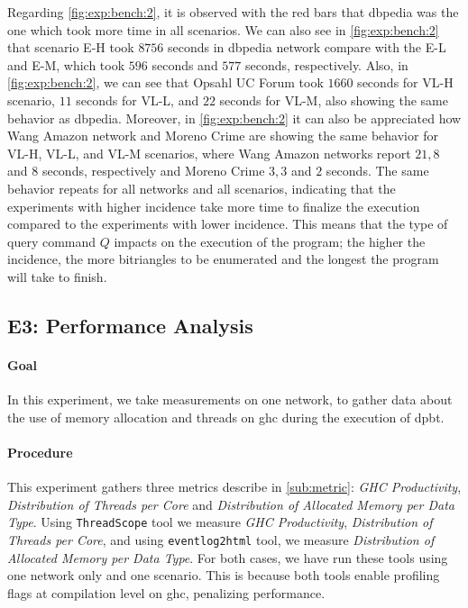 Regarding \autoref{fig:exp:bench:2}, it is observed with the red bars that \acrshort{dbpedia} was the one which took more time in all scenarios.
We can also see in \autoref{fig:exp:bench:2} that scenario E-H took $8756$ seconds in \acrshort{dbpedia} network compare with the E-L and E-M, which took $596$ seconds and $577$ seconds, respectively. 
Also, in \autoref{fig:exp:bench:2}, we can see that Opsahl UC Forum took $1660$ seconds for VL-H scenario, $11$ seconds for VL-L, and $22$ seconds for VL-M, also showing the same behavior as \acrshort{dbpedia}.
Moreover, in \autoref{fig:exp:bench:2} it can also be appreciated how Wang Amazon network and Moreno Crime are showing the same behavior for VL-H, VL-L, and VL-M scenarios, where Wang Amazon networks report $21, 8$ and $8$ seconds, respectively and Moreno Crime $3, 3$ and $2$ seconds.
The same behavior repeats for all networks and all scenarios, indicating that the experiments with higher incidence take more time to finalize the execution compared to the experiments with lower incidence. This means that the type of query command $Q$ impacts on the execution of the program; the higher the incidence, the more bitriangles to be enumerated and the longest the program will take to finish.

\subsection{E3: Performance Analysis}\label{sub:sec:exp-3} 
\paragraph{Goal} In this experiment, we take measurements on one network, to gather data about the use of memory allocation and threads on \acrshort{ghc} during the execution of \acrshort{dpbt}.

\paragraph{Procedure} This experiment gathers three metrics describe in \autoref{sub:metric}: \emph{GHC Productivity}, \emph{Distribution of Threads per Core} and \emph{Distribution of Allocated Memory per Data Type}.
Using \texttt{ThreadScope} \cite{threadscope} tool we measure \emph{GHC Productivity}, \emph{Distribution of Threads per Core}, and using \texttt{eventlog2html} \cite{eventlog2html} tool, we measure \emph{Distribution of Allocated Memory per Data Type}.
For both cases, we have run these tools using one network only and one scenario. This is because both tools enable profiling flags at compilation level on \acrshort{ghc}, penalizing performance.

